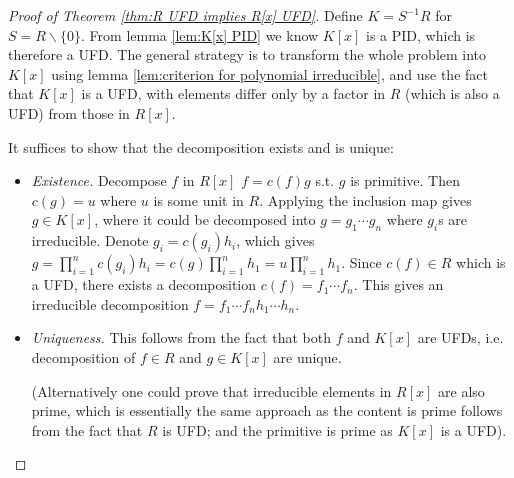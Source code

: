 \documentclass{article}
\begin{document}
\begin{proof}[Proof of Theorem \ref{thm:R UFD implies R[x] UFD}]
    Define $K = S^{-1}R$ for $S = R \smallsetminus\{0\}$. From lemma \ref{lem:K[x] PID} we know $K[x]$ is a PID, which is therefore a UFD. The general strategy is to transform the whole problem into $K[x]$ using lemma \ref{lem:criterion for polynomial irreducible}, and use the fact that $K[x]$ is a UFD, with elements differ only by a factor in $R$ (which is also a UFD) from those in $R[x]$.

    It suffices to show that the decomposition exists and is unique:
    \begin{itemize}
        \item \emph{Existence.} Decompose $f$ in $R[x]$ $f = c(f) g$ s.t. $g$ is primitive. Then $c(g) = u$ where $u$ is some unit in $R$. Applying the inclusion map gives $g\in K[x]$, where it could be decomposed into $g = g_1\cdots g_n$ where $g_i$s are irreducible. Denote $g_i = c(g_i) h_i$, which gives $g = \prod_{i=1}^n c(g_i) h_i = c(g) \prod_{i=1}^n h_1 = u\prod_{i=1}^n h_1$. Since $c(f) \in R$ which is a UFD, there exists a decomposition $c(f) = f_1\cdots f_n$. This gives an irreducible decomposition $f = f_1\cdots f_n h_1\cdots h_n$.
        \item \emph{Uniqueness.} This follows from the fact that both $f$ and $K[x]$ are UFDs, i.e. decomposition of $f\in R$ and $g\in K[x]$ are unique.
        
        (Alternatively one could prove that irreducible elements in $R[x]$ are also prime, which is essentially the same approach as the content is prime follows from the fact that $R$ is UFD; and the primitive is prime as $K[x]$ is a UFD).
    \end{itemize}
\end{proof}
\end{document}
